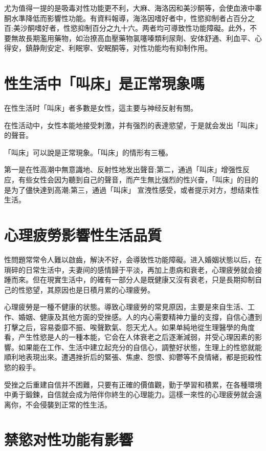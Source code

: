 \documentclass[12pt,UTF8]{ctexbook}
\begin{document}
尤为值得一提的是吸毒对性功能更不利，大麻、海洛因和美沙酮等，会使血液中睾酮水準降低而影響性功能。有資料報導，海洛因嗜好者中，性慾抑制者占百分之百;美沙酮嗜好者，性慾抑制百分之九十六。两者均可導致性功能障礙。此外，不要無故長期濫用藥物，如治撩高血壓藥物氯噻嗪類利尿劑、安体舒通、利血平、心得安，鎮静劑安定、利眠寧、安眠酮等，对性功能均有抑制作用。

\section{性生活中「叫床」是正常現象嗎}

在性生活时「叫床」者多數是女性，這主要与神经反射有關。

在性活动中，女性本能地接受刺激，并有强烈的表達慾望，于是就会发出「叫床」的聲音。

「叫床」可以說是正常現象。「叫床」的情形有三種。

第一是在性高潮中無意識地、反射性地发出聲音;第二，通過「叫床」增强性反应，有些女性会因为聽到自己的聲音，而产生無比强烈的性兴奋，「叫床」的目的是为了儘快達到高潮;第三，通過「叫床」
宣洩性感受，或者提示对方，想结束性生活。

\section{心理疲勞影響性生活品質}

性問題常常令人難以啟齒，解決不好，会導致性功能障礙。进入婚姻状態以后，在瑣碎的日常生活中，夫妻间的感情歸于平淡，再加上患病和衰老，心理疲勞就会接踵而來。但在現實生活中，的確有一部分人是既健康又沒有衰老，只是長期抑制自己的性慾望，其原因也是日積月累的心理疲勞。

心理疲勞是一種不健康的状態。導致心理疲勞的常見原因，主要是來自生活、工作、婚姻、健康及其他方面的受挫感。人的内心需要精神力量的支撐，自信心遭到打擊之后，容易委靡不振、唉聲歎氣、怨天尤人。如果单純地從生理醫學的角度看，产生性慾是人的一種本能，它会在人体衰老之后逐漸減弱，并受心理因素的影響。如果能在工作、生活中建立起充分的自信心，調整好状態，生理上的性慾就能順利地表現出來。遭遇挫折后的緊張、焦慮、怨恨、抑鬱等不良情緒，都是扼殺性慾的殺手。

受挫之后重建自信并不困難，只要有正確的價值觀，勤于學習和積累，在各種環境中勇于鍛鍊，自信就会成为陪伴你終生的心理能力。這樣一來性的心理疲勞就会遠离你，不会侵襲到正常的性生活。

\section{禁慾对性功能有影響}
\end{document}
